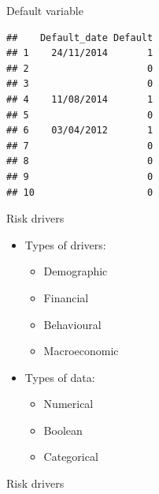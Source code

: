 \documentclass[9pt,ignorenonframetext,]{beamer}
\newenvironment{Shaded}{\begin{snugshade}}{\end{snugshade}}
\newcommand{\KeywordTok}[1]{\textcolor[rgb]{0.13,0.29,0.53}{\textbf{#1}}}
\newcommand{\DataTypeTok}[1]{\textcolor[rgb]{0.13,0.29,0.53}{#1}}
\newcommand{\DecValTok}[1]{\textcolor[rgb]{0.00,0.00,0.81}{#1}}
\newcommand{\StringTok}[1]{\textcolor[rgb]{0.31,0.60,0.02}{#1}}
\newcommand{\OtherTok}[1]{\textcolor[rgb]{0.56,0.35,0.01}{#1}}
\newcommand{\OperatorTok}[1]{\textcolor[rgb]{0.81,0.36,0.00}{\textbf{#1}}}
\newcommand{\NormalTok}[1]{#1}
\providecommand{\tightlist}{%
  \setlength{\itemsep}{0pt}\setlength{\parskip}{0pt}}
\begin{document}
\begin{frame}[fragile]{Default variable}

\begin{Shaded}
\end{Shaded}

\begin{verbatim}
##    Default_date Default
## 1    24/11/2014       1
## 2                     0
## 3                     0
## 4    11/08/2014       1
## 5                     0
## 6    03/04/2012       1
## 7                     0
## 8                     0
## 9                     0
## 10                    0
\end{verbatim}

\end{frame}

\begin{frame}{Risk drivers}

\begin{itemize}
\tightlist
\item
  Types of drivers:

  \begin{itemize}
  \tightlist
  \item
    Demographic
  \item
    Financial
  \item
    Behavioural
  \item
    Macroeconomic
  \end{itemize}
\item
  Types of data:

  \begin{itemize}
  \tightlist
  \item
    Numerical
  \item
    Boolean
  \item
    Categorical
  \end{itemize}
\end{itemize}

\end{frame}

\begin{frame}[fragile]{Risk drivers}

\begin{Shaded}
\end{Shaded}

\end{frame}
\end{document}
